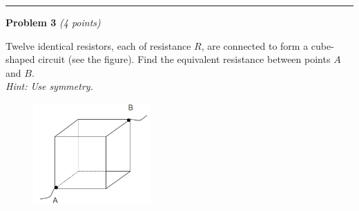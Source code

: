 \documentclass[a4paper, 11pt]{article}
\newenvironment{problem}[3][Problem]
    { \begin{mdframed}[backgroundcolor=gray!20] \textbf{#1 #2} \textit{(#3 points)} }
    {  \end{mdframed}}
\begin{document}
\noindent\rule{7.1in}{2.8pt}

\begin{problem}{3}{4}
\par Twelve identical resistors, each of resistance $R$, are connected to form a cube-shaped circuit (see the figure). Find the equivalent resistance  between points $A$ and $B$. \\
\textit{Hint: Use symmetry.}
\end{problem}
\begin{figure}[!htbp]
	\centering
	\includegraphics[width=0.4\textwidth]{hw5_p3_question.png}
	\label{fig:p3}
\end{figure}
\end{document}

